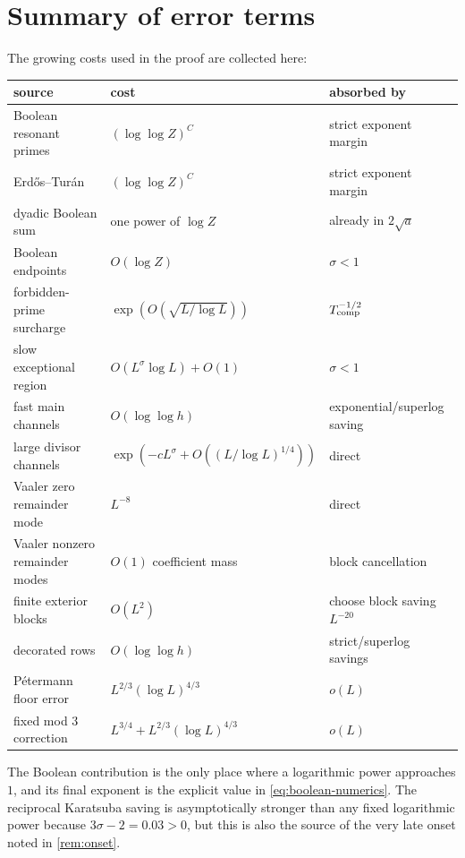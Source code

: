\documentclass[11pt]{article}
\theoremstyle{definition}
\theoremstyle{remark}
\newcommand{\1}{\mathbf 1}
\begin{document}
\section{Summary of error terms}\label{app:error-summary}
The growing costs used in the proof are collected here:
\begin{center}
\begin{tabular}{@{}lll@{}}
\toprule
source & cost & absorbed by \\
\midrule
Boolean resonant primes & $(\log\log Z)^C$ & strict exponent margin \\
Erd\H{o}s--Tur\'an & $(\log\log Z)^C$ & strict exponent margin \\
dyadic Boolean sum & one power of $\log Z$ & already in $2\sqrt a$ \\
Boolean endpoints & $O(\log Z)$ & $\sigma<1$ \\
forbidden-prime surcharge & $\exp(O(\sqrt{L/\log L}))$ & $T_{\rm comp}^{-1/2}$ \\
slow exceptional region & $O(L^\sigma\log L)+O(1)$ & $\sigma<1$ \\
fast main channels & $O(\log\log h)$ & exponential/superlog saving \\
large divisor channels & $\exp(-cL^\sigma+O((L/\log L)^{1/4}))$ & direct \\
Vaaler zero remainder mode & $L^{-8}$ & direct \\
Vaaler nonzero remainder modes & $O(1)$ coefficient mass & block cancellation \\
finite exterior blocks & $O(L^2)$ & choose block saving $L^{-20}$ \\
decorated rows & $O(\log\log h)$ & strict/superlog savings \\
P\'etermann floor error & $L^{2/3}(\log L)^{4/3}$ & $o(L)$ \\
fixed mod $3$ correction & $L^{3/4}+L^{2/3}(\log L)^{4/3}$ & $o(L)$ \\
\bottomrule
\end{tabular}
\end{center}
The Boolean contribution is the only place where a logarithmic power approaches $1$, and its final exponent is the explicit value in \cref{eq:boolean-numerics}.  The reciprocal Karatsuba saving is asymptotically stronger than any fixed logarithmic power because $3\sigma-2=0.03>0$, but this is also the source of the very late onset noted in \cref{rem:onset}.



\end{document}
